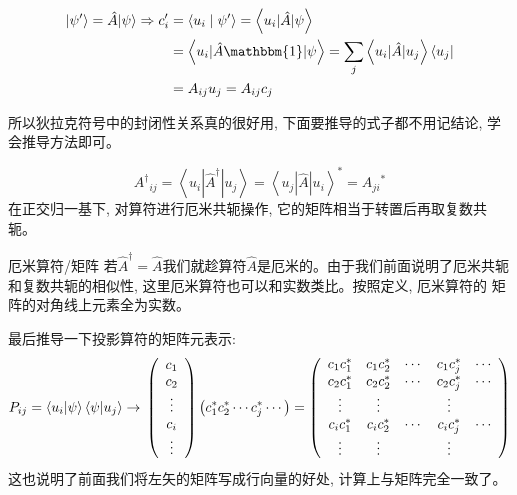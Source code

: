 \begin{equation*}
    \begin{aligned}
        \left|\psi^{\prime}\right\rangle=\hat{A}|\psi\rangle \Rightarrow c_{i}^{\prime} &=\left\langle u_{i} \mid \psi^{\prime}\right\rangle=\left\langle u_{i}|\hat{A}| \psi\right\rangle \\
        &=\left\langle u_{i}|\hat{A} \mathbbm{1}| \psi\right\rangle=\sum_{j}\left\langle u_{i}|\hat{A}| u_{j}\right\rangle\left\langle u_{j}\right| \\
        &=A_{i j} u_{j}=A_{i j} c_{j}
    \end{aligned}
\end{equation*}
\begin{thinknote}
    所以狄拉克符号中的封闭性关系真的很好用, 下面要推导的式子都不用记结论, 学会推导方法即可。
\end{thinknote}
\begin{equation*}
    \boxed{
        A^{\dagger}{ }_{i j}=\left\langle u_{i}\left|\hat{A}^{\dagger}\right| u_{j}\right\rangle=\left\langle u_{j}|\hat{A}| u_{i}\right\rangle^{*}=A_{j i}{ }^{*}
    }
    \end{equation*}
在正交归一基下, 对算符进行厄米共轭操作, 它的矩阵相当于转置后再取复数共轭。
\begin{define}{厄米算符/矩阵}
    若$\hat{A}^\dagger=\hat{A}$我们就趁算符$\hat{A}$是厄米的。由于我们前面说明了厄米共轭和复数共轭的相似性, 这里厄米算符也可以和实数类比。按照定义, 厄米算符的
    矩阵的对角线上元素全为实数。
\end{define}
最后推导一下投影算符的矩阵元表示:
\begin{equation*}
    P_{ij} =\left\langle u_i|\psi\right\rangle\left\langle\psi| u_j \right\rangle\rightarrow\\
    \left(\begin{array}{c}
        c_{1} \\
        c_{2} \\
        \vdots \\
        c_{i} \\
        \vdots
        \end{array}\right)\left(c_{1}^{*} c_{2}^{*} \cdots c_{j}^{*} \cdots\right)=\left(\begin{array}{ccccc}
        c_{1} c_{1}^{*} & c_{1} c_{2}^{*} & \cdots & c_{1} c_{j}^{*} & \cdots \\
        c_{2} c_{1}^{*} & c_{2} c_{2}^{*} & \cdots & c_{2} c_{j}^{*} & \cdots \\
        \vdots & \vdots & & \vdots & \\
        c_{i} c_{1}^{*} & c_{i} c_{2}^{*} & \cdots & c_{i} c_{j}^{*} & \cdots \\
        \vdots & \vdots & & \vdots &
        \end{array}\right)
\end{equation*}
这也说明了前面我们将左矢的矩阵写成行向量的好处, 计算上与矩阵完全一致了。
